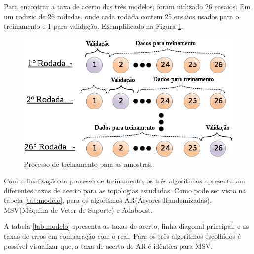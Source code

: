 \documentclass[a4paper, 10pt]{article}
\begin{document}
Para encontrar a taxa de acerto dos três modelos, foram utilizado
26 ensaios. Em um rodizio de 26 rodadas, onde cada rodada contem 
25 ensaios usados para o treinamento e 1 para
validação. Exemplificado 
na Figura \ref{fig_treinamento}.

\begin{figure}[!h]
    \caption{\label{fig_treinamento}Processo de treinamento para as amostras.}
	    \begin{center}
            \includegraphics[scale=0.5]{../fotos/principio/rodizio.png}
	    \end{center}
\end{figure}

Com a finalização do processo de treinamento, os três algorítimos 
apresentaram diferentes taxas de acerto para as topologias estudadas.
Como pode ser visto na tabela \ref{tab:modelo}, para 
os algoritmos AR(Árvores Randomizadas),  MSV(Máquina de Vetor de Suporte) e Adaboost.

A tabela \ref{tab:modelo} apresenta as taxas de acerto, linha diagonal principal, 
e as taxas de erros em comparação com o real. Para os três algoritmos escolhidos 
é possível visualizar que, a taxa de acerto de AR é idêntica para MSV.
\end{document}
